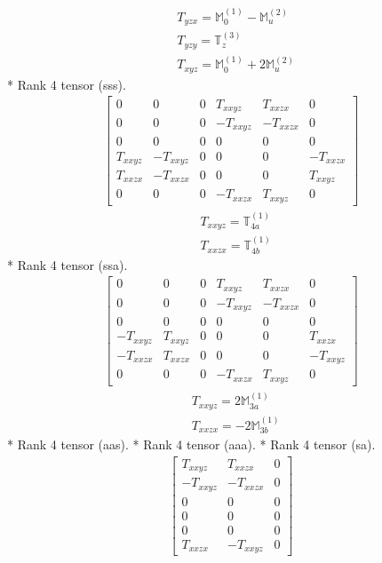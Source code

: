 \documentclass[fleqn,8pt,landscape]{jsarticle}
\begin{document}
\begin{align*}
& T_{yzx} = \mathbb{M}_{0}^{(1)} - \mathbb{M}_{u}^{(2)} \\
& T_{yzy} = \mathbb{T}_{z}^{(3)} \\
& T_{xyz} = \mathbb{M}_{0}^{(1)} + 2 \mathbb{M}_{u}^{(2)}
\end{align*}
* Rank 4 tensor (sss).
\begin{align*}
\begin{bmatrix} 0 & 0 & 0 & T_{xxyz} & T_{xxzx} & 0 \\ 0 & 0 & 0 & - T_{xxyz} & - T_{xxzx} & 0 \\ 0 & 0 & 0 & 0 & 0 & 0 \\ T_{xxyz} & - T_{xxyz} & 0 & 0 & 0 & - T_{xxzx} \\ T_{xxzx} & - T_{xxzx} & 0 & 0 & 0 & T_{xxyz} \\ 0 & 0 & 0 & - T_{xxzx} & T_{xxyz} & 0 \end{bmatrix}
\end{align*}
\begin{align*}
& T_{xxyz} = \mathbb{T}_{4a}^{(1)} \\
& T_{xxzx} = \mathbb{T}_{4b}^{(1)}
\end{align*}
* Rank 4 tensor (ssa).
\begin{align*}
\begin{bmatrix} 0 & 0 & 0 & T_{xxyz} & T_{xxzx} & 0 \\ 0 & 0 & 0 & - T_{xxyz} & - T_{xxzx} & 0 \\ 0 & 0 & 0 & 0 & 0 & 0 \\ - T_{xxyz} & T_{xxyz} & 0 & 0 & 0 & T_{xxzx} \\ - T_{xxzx} & T_{xxzx} & 0 & 0 & 0 & - T_{xxyz} \\ 0 & 0 & 0 & - T_{xxzx} & T_{xxyz} & 0 \end{bmatrix}
\end{align*}
\begin{align*}
& T_{xxyz} = 2 \mathbb{M}_{3a}^{(1)} \\
& T_{xxzx} = - 2 \mathbb{M}_{3b}^{(1)}
\end{align*}
* Rank 4 tensor (aas).
* Rank 4 tensor (aaa).
* Rank 4 tensor (sa).
\begin{align*}
\begin{bmatrix} T_{xxyz} & T_{xxzx} & 0 \\ - T_{xxyz} & - T_{xxzx} & 0 \\ 0 & 0 & 0 \\ 0 & 0 & 0 \\ 0 & 0 & 0 \\ T_{xxzx} & - T_{xxyz} & 0 \end{bmatrix}
\end{align*}
\end{document}
